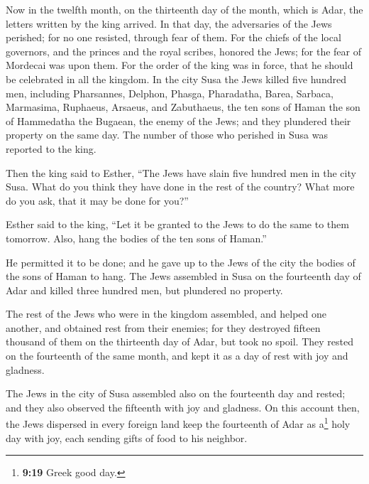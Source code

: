  Now in the twelfth month, on the thirteenth day of the
month, which is Adar, the letters written by the king arrived.
 In that day, the adversaries of the Jews perished; for no
one resisted, through fear of them.  For the chiefs of the
local governors, and the princes and the royal scribes, honored the
Jews; for the fear of Mordecai was upon them.  For the
order of the king was in force, that he should be celebrated in all the
kingdom.  In the city Susa the Jews killed five hundred
men,  including Pharsannes, Delphon, Phasga,
 Pharadatha, Barea, Sarbaca,  Marmasima,
Ruphaeus, Arsaeus, and Zabuthaeus,  the ten sons of Haman
the son of Hammedatha the Bugaean, the enemy of the Jews; and they
plundered their property on the same day.  The number of
those who perished in Susa was reported to the king.

 Then the king said to Esther, ``The Jews have slain five
hundred men in the city Susa. What do you think they have done in the
rest of the country? What more do you ask, that it may be done for
you?''

 Esther said to the king, ``Let it be granted to the Jews
to do the same to them tomorrow. Also, hang the bodies of the ten sons
of Haman.''

 He permitted it to be done; and he gave up to the Jews
of the city the bodies of the sons of Haman to hang.  The
Jews assembled in Susa on the fourteenth day of Adar and killed three
hundred men, but plundered no property.

 The rest of the Jews who were in the kingdom assembled,
and helped one another, and obtained rest from their enemies; for they
destroyed fifteen thousand of them on the thirteenth day of Adar, but
took no spoil.  They rested on the fourteenth of the same
month, and kept it as a day of rest with joy and gladness.

 The Jews in the city of Susa assembled also on the
fourteenth day and rested; and they also observed the fifteenth with joy
and gladness.  On this account then, the Jews dispersed
in every foreign land keep the fourteenth of Adar as a\footnote{\textbf{9:19}
  Greek good day.} holy day with joy, each sending gifts of food to his
neighbor.

